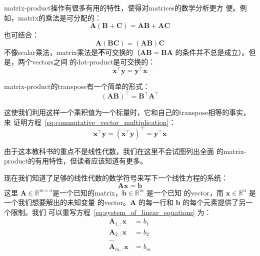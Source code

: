 \gls*{matrix-product}操作有很多有用的特性，使得对\gls*{matrices}的数学分析更方
便。例如，\gls*{matrix}的乘法是可分配的：
\begin{equation}
  \pmb{A}(\pmb{B} + \pmb{C}) = \pmb{A}\pmb{B} + \pmb{A}\pmb{C}
  \label{eq:distributive_matrix_multiplication}
\end{equation}
也可结合：
\begin{equation}
  \pmb{A}(\pmb{B}\pmb{C}) = (\pmb{A}\pmb{B})\pmb{C}
  \label{eq:associative_matrix_multiplication}
\end{equation}
不像\gls*{scalar}乘法，\gls*{matrix}乘法是\textbf{不}可交换的（$\pmb{A}\pmb{B} =
\pmb{B}\pmb{A}$ 的条件并不总是成立）。但是，两个\gls*{vectors}之间
的\gls*{dot-product}是可交换的：
\begin{equation}
  \pmb{x}^{\top}\pmb{y} = \pmb{y}^{\top}\pmb{x}
  \label{eq:commutative_vector_multiplication}
\end{equation}

\gls*{matrix-product}的\gls*{transpose}有一个简单的形式：
\begin{equation}
  (\pmb{A}\pmb{B})^{\top} = \pmb{B}^{\top}\pmb{A}^{\top}
  \label{eq:transpose_of_matrix_product}
\end{equation}

这使我们利用这样一个乘积值为一个标量时，它和自己的\gls*{transpose}相等的事实，来
证明方程~\ref{eq:commutative_vector_multiplication}：
\begin{equation}
  \pmb{x}^{\top}\pmb{y} = (\pmb{x}^{\top}\pmb{y})^{\top} = \pmb{y}^{\top}\pmb{x}
  \label{eq:demonstrate_commutative_vector_multiplication}
\end{equation}

由于这本教科书的重点不是线性代数，我们在这里不会试图列出全面
的\gls*{matrix-product}的有用特性，但读者应该知道有更多。

现在我们知道了足够的线性代数的数学符号来写下一个线性方程的系统：
\begin{equation}
  \pmb{A}\pmb{x} = \pmb{b}
  \label{eq:system_of_linear_equations}
\end{equation}
这里 $\pmb{A} \in \mathbb{R}^{m \times
  n}$是一个已知的\gls*{matrix}，$\pmb{b} \in \mathbb{R}^m$ 是一个已知
的\gls*{vector}，而 $\pmb{x} \in \mathbb{R}^n$ 是一个我们想要解出的未知变量
的\gls*{vector}。$\pmb{A}$ 的每一行和 $\pmb{b}$ 的每个元素提供了另一个限制。我们
可以重写方程~\ref{eq:system_of_linear_equations} 为：
\begin{align}
  \pmb{A}_{1,:}\pmb{x} &= b_1\\
  \pmb{A}_{2,:}\pmb{x} &= b_2\\
  \ldots \\
  \pmb{A}_{m,:}\pmb{x} &= b_m
\end{align}

